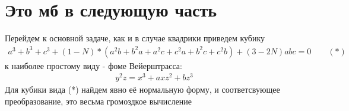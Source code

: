 \section*{Это мб в следующую часть}
Перейдем к основной задаче, как и в случае квадрики приведем кубику 
\[
\begin{aligned}
	a^3 + b^3 + c^3 + (1 - N) * (a^2b + b^2a + a^2c + c^2a + b^2c + c^2b) +(3 - 2N)abc = 0 \qquad (*)
\end{aligned}  
\] 
к наиболее простому виду - фоме Вейерштрасса:
\[
\begin{aligned}
	y^2z = x^3 + axz^2 + bz^3
\end{aligned} 
\]
Для кубики вида (*) найдем явно её нормальную форму, и соответсвующее преобразование, это весьма громоздкое вычисление 
